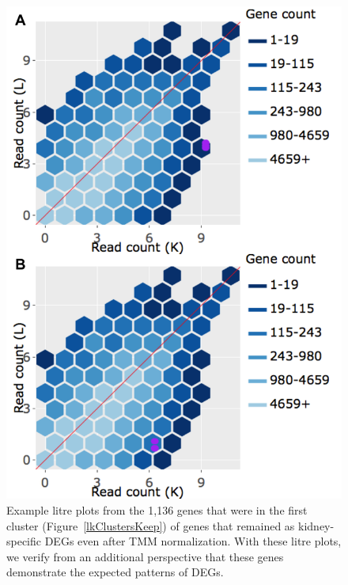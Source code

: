 \documentclass{article}
\begin{document}
  
  \null
  \begin{figure}[t!]
  \centerline{\includegraphics[width=0.7\columnwidth]{../MakeFigures/Dashboards/litreClusterKeep/litreClusterKeep.jpg}}
  \caption{Example litre plots from the 1,136 genes that were in the first cluster (Figure~\ref{lkClustersKeep}) of genes that remained as kidney-specific DEGs even after TMM normalization. With these litre plots, we verify from an additional perspective that these genes demonstrate the expected patterns of DEGs.
  \label{litreClusterKeep}}
  \end{figure}
  
\end{document}
